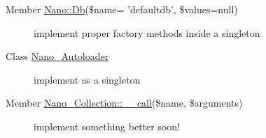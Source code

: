 \label{todo__todo000003}
\hypertarget{todo__todo000003}{}
 \begin{description}
\item[Member \hyperlink{classNano_abd2e5c3823a0c0d688b457f882d4c6d}{Nano::Db}(\$name= 'defaultdb', \$values=null) ]implement proper factory methods inside a singleton

\end{description}


\label{todo__todo000001}
\hypertarget{todo__todo000001}{}
 \begin{description}
\item[Class \hyperlink{classNano__Autoloader}{Nano\_\-Autoloader} ]implement as a singleton \end{description}


\label{todo__todo000002}
\hypertarget{todo__todo000002}{}
 \begin{description}
\item[Member \hyperlink{classNano__Collection_592401d11ce0c63a3e8ed74545bf6917}{Nano\_\-Collection::\_\-\_\-call}(\$name, \$arguments) ]implement something better soon! \end{description}
